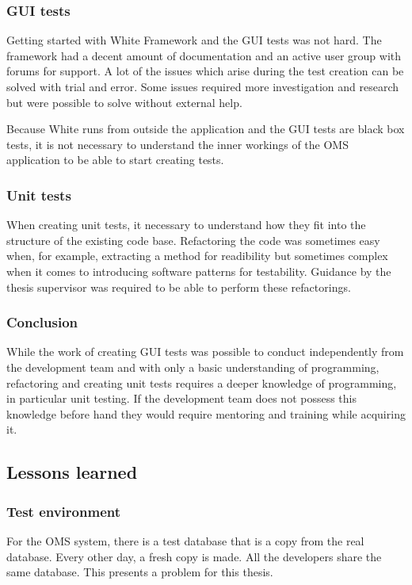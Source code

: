 \documentclass{article}
\begin{document}
			\subsubsection{GUI tests}
			Getting started with White Framework and the GUI tests was not hard. The framework had a decent amount of documentation and an active user group with forums for support. A lot of the issues which arise during the test creation can be solved with trial and error. Some issues required more investigation and research but were possible to solve without external help. 

			Because White runs from outside the application and the GUI tests are black box tests, it is not necessary to understand the inner workings of the OMS application to be able to start creating tests.

			\subsubsection{Unit tests}
			When creating unit tests, it necessary to understand how they fit into the structure of the existing code base. Refactoring the code was sometimes easy when, for example, extracting a method for readibility but sometimes complex when it comes to introducing software patterns for testability. Guidance by the thesis supervisor was required to be able to perform these refactorings.

			\subsubsection{Conclusion}
			While the work of creating GUI tests was possible to conduct independently from the development team and with only a basic understanding of programming, refactoring and creating unit tests requires a deeper knowledge of programming, in particular unit testing. If the development team does not possess this knowledge before hand they would require mentoring and training while acquiring it.

		\subsection{Lessons learned}
			\subsubsection{Test environment}
			
			For the OMS system, there is a test database that is a copy from the real database. Every other day, a fresh copy is made. All the developers share the same database. This presents a problem for this thesis. 
\end{document}
